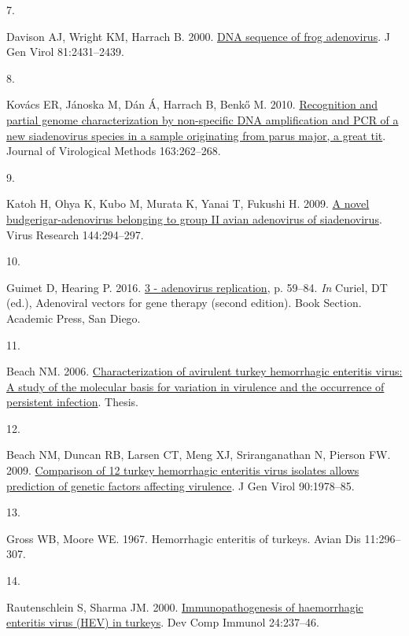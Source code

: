 \documentclass[
]{article}
\newlength{\cslhangindent}
\newlength{\csllabelwidth}
\newenvironment{CSLReferences}[2] %
 {\begin{list}{}{%
  \setlength{\itemindent}{0pt}
  \setlength{\leftmargin}{0pt}
  \setlength{\parsep}{0pt}
  \ifodd #1
   \setlength{\leftmargin}{\cslhangindent}
   \setlength{\itemindent}{-1\cslhangindent}
  \fi
  \setlength{\itemsep}{#2\baselineskip}}}
 {\end{list}}
\newcommand{\CSLLeftMargin}[1]{\parbox[t]{\csllabelwidth}{\strut#1\strut}}
\newcommand{\CSLRightInline}[1]{\parbox[t]{\linewidth - \csllabelwidth}{\strut#1\strut}}
\begin{document}
\begin{CSLReferences}{0}{1}
\CSLLeftMargin{7. }%
\CSLRightInline{Davison AJ, Wright KM, Harrach B. 2000.
\href{https://doi.org/10.1099/0022-1317-81-10-2431}{DNA sequence of frog
adenovirus}. J Gen Virol 81:2431--2439.}

\CSLLeftMargin{8. }%
\CSLRightInline{Kovács ER, Jánoska M, Dán Á, Harrach B, Benkő M. 2010.
\href{https://doi.org/10.1016/j.jviromet.2009.10.007}{Recognition and
partial genome characterization by non-specific DNA amplification and
PCR of a new siadenovirus species in a sample originating from parus
major, a great tit}. Journal of Virological Methods 163:262--268.}

\CSLLeftMargin{9. }%
\CSLRightInline{Katoh H, Ohya K, Kubo M, Murata K, Yanai T, Fukushi H.
2009. \href{https://doi.org/10.1016/j.virusres.2009.04.012}{A novel
budgerigar-adenovirus belonging to group II avian adenovirus of
siadenovirus}. Virus Research 144:294--297.}

\CSLLeftMargin{10. }%
\CSLRightInline{Guimet D, Hearing P. 2016.
\href{https://doi.org/10.1016/B978-0-12-800276-6.00003-6}{3 - adenovirus
replication}, p. 59--84. \emph{In} Curiel, DT (ed.), Adenoviral vectors
for gene therapy (second edition). Book Section. Academic Press, San
Diego.}

\CSLLeftMargin{11. }%
\CSLRightInline{Beach NM. 2006.
\href{http://scholar.lib.vt.edu/theses/available/etd-08142006-145339/}{Characterization
of avirulent turkey hemorrhagic enteritis virus: A study of the
molecular basis for variation in virulence and the occurrence of
persistent infection}. Thesis.}

\CSLLeftMargin{12. }%
\CSLRightInline{Beach NM, Duncan RB, Larsen CT, Meng XJ, Sriranganathan
N, Pierson FW. 2009.
\href{https://doi.org/10.1099/vir.0.010090-0}{Comparison of 12 turkey
hemorrhagic enteritis virus isolates allows prediction of genetic
factors affecting virulence}. J Gen Virol 90:1978--85.}

\CSLLeftMargin{13. }%
\CSLRightInline{Gross WB, Moore WE. 1967. Hemorrhagic enteritis of
turkeys. Avian Dis 11:296--307.}

\CSLLeftMargin{14. }%
\CSLRightInline{Rautenschlein S, Sharma JM. 2000.
\href{https://doi.org/10.1016/s0145-305x(99)00075-0}{Immunopathogenesis
of haemorrhagic enteritis virus (HEV) in turkeys}. Dev Comp Immunol
24:237--46.}


\end{CSLReferences}
\end{document}
